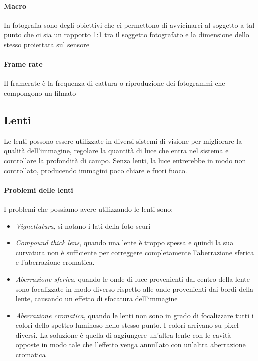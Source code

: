 \paragraph{Macro}
In fotografia sono degli obiettivi che ci permettono di avvicinarci al soggetto a tal punto che ci sia un rapporto 1:1 tra il soggetto fotografato e la dimensione dello stesso proiettata sul sensore

\paragraph{Frame rate}
Il framerate è la frequenza di cattura o riproduzione dei fotogrammi che compongono un filmato

\subsection{Lenti}
Le lenti possono essere utilizzate in diversi sistemi di visione per migliorare la qualità dell'immagine, regolare la quantità di luce che entra nel sistema e controllare la profondità di campo. Senza lenti, la luce entrerebbe in modo non controllato, producendo immagini poco chiare e fuori fuoco.

\paragraph{Problemi delle lenti}
I problemi che possiamo avere utilizzando le lenti sono:
\begin{itemize}
    \item \textit{Vignettatura}, si notano i lati della foto scuri
    \item \textit{Compound thick lens}, quando una lente è troppo spessa e quindi la sua curvatura non è sufficiente per correggere completamente l'aberrazione sferica e l'aberrazione cromatica.
    \item \textit{Aberrazione sferica}, quando le onde di luce provenienti dal centro della lente sono focalizzate in modo diverso rispetto alle onde provenienti dai bordi della lente, causando un effetto di sfocatura dell'immagine
    \item \textit{Aberrazione cromatica}, quando le lenti non sono in grado di focalizzare tutti i colori dello spettro luminoso nello stesso punto. I colori arrivano su pixel diversi. La soluzione è quella di aggiungere un’altra lente con le cavità opposte in modo tale che l’effetto venga annullato con un’altra aberrazione cromatica
\end{itemize}


